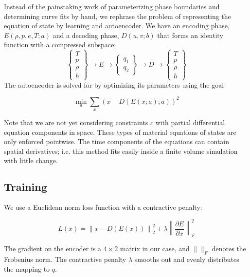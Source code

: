 \documentclass[AMA,STIX1COL]{WileyNJD-v2}
\begin{document}
Instead of the painstaking work of parameterizing phase boundaries and
determining curve fits by hand, we rephrase the problem of representing
the equation of state by learning and autoencoder. We have an encoding
phase, \(E(\rho,p,e,T; a)\) and a decoding phase, \(D(u,v; b)\) that
forms an identity function with a compressed subspace:
\begin{equation}
\left\{ \begin{array}{c}
T\\ p\\ \rho\\ h
\end{array}\right\} \rightarrow  E \rightarrow 
\left\{ \begin{array}{c} q_1\\q_2 \end{array} \right\}\rightarrow D \rightarrow 
\left\{ \begin{array}{c}
T\\ p\\ \rho\\ h
\end{array}\right\}
\end{equation}
The autoencoder is solved for by optimizing its parameters using the
goal

\begin{equation}
\min_a \sum_x \left( x - D(E(x;a);a) \right)^2
\end{equation}

Note that we are not yet considering constraints \(c\) with partial
differential equation components in space. These types of material
equations of states are only enforced pointwise. The time components of
the equations can contain spatial derivatives; i.e. this method fits
easily inside a finite volume simulation with little change.

\hypertarget{header-n3305}{%
\subsection{Training}\label{header-n3305}}

We use a Euclidean norm loss function with a contractive penalty:

\[L(x)=\left\|x-D(E(x))\right\|^2_2+\lambda\left\|\frac{\partial E}{\partial x}\right\|_F^2\]

The gradient on the encoder is a \(4\times2\) matrix in our case, and
\(\|\|_F\) denotes the Frobenius norm. The contractive penalty
\(\lambda\) smooths out and evenly distributes the mapping to \(q\).
\end{document}
